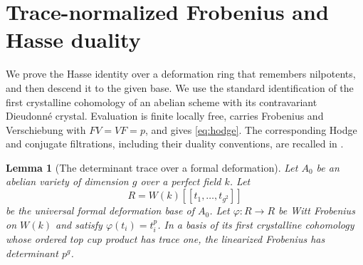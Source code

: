 \documentclass[11pt]{article}
\newtheorem{lemma}[theorem]{Lemma}
\theoremstyle{definition}\newtheorem{definition}[theorem]{Definition}
\theoremstyle{remark}\newtheorem{remark}[theorem]{Remark}
\begin{document}
\section{Trace-normalized Frobenius and Hasse duality}\label{sec:hasse-proof}

We prove the Hasse identity over a deformation ring that remembers nilpotents, and then descend it to the given base. We use the standard identification of the first crystalline cohomology of an abelian scheme with its contravariant Dieudonn\'e crystal. Evaluation is finite locally free, carries Frobenius and Verschiebung with $FV=VF=p$, and gives \eqref{eq:hodge}. The corresponding Hodge and conjugate filtrations, including their duality conventions, are recalled in \citet[\S2.1, pp.~11--12]{Bijakowski}.

\begin{lemma}[The determinant trace over a formal deformation]\label{lem:trace}
Let $A_0$ be an abelian variety of dimension $g$ over a perfect field $k$. Let
\[
 R=W(k)[[t_1,\ldots,t_{g^2}]]
\]
be the universal formal deformation base of $A_0$. Let $\varphi:R\to R$ be Witt Frobenius on $W(k)$ and satisfy $\varphi(t_i)=t_i^p$. In a basis of its first crystalline cohomology whose ordered top cup product has trace one, the linearized Frobenius has determinant $p^g$.
\end{lemma}
\end{document}
